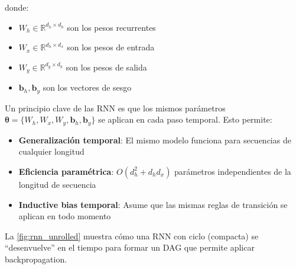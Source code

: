 donde:
\begin{itemize}
	\item $W_h \in \mathbb{R}^{d_h \times d_h}$ son los pesos recurrentes
	\item $W_x \in \mathbb{R}^{d_h \times d_x}$ son los pesos de entrada
	\item $W_y \in \mathbb{R}^{d_y \times d_h}$ son los pesos de salida
	\item $\mathbf{b}_h, \mathbf{b}_y$ son los vectores de sesgo
\end{itemize}

Un principio clave de las \gls{RNN} es que los mismos parámetros $\boldsymbol{\theta} = \{W_h, W_x, W_y, \mathbf{b}_h, \mathbf{b}_y\}$ se aplican en cada paso temporal. Esto permite:
\begin{itemize}
	\item \textbf{Generalización temporal}: El mismo modelo funciona para secuencias de cualquier longitud
	\item \textbf{Eficiencia paramétrica}: $O(d_h^2 + d_h d_x)$ parámetros independientes de la longitud de secuencia
	\item \textbf{Inductive bias temporal}: Asume que las mismas reglas de transición se aplican en todo momento
\end{itemize}

La \autoref{fig:rnn_unrolled} muestra cómo una RNN con ciclo (compacta) se ``desenvuelve'' en el tiempo para formar un \gls{DAG} que permite aplicar backpropagation.

